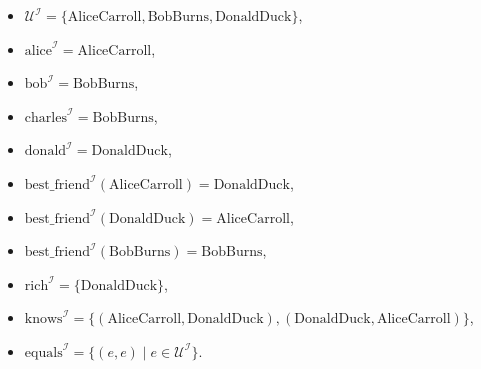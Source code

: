 \documentclass{acAssignment}
\begin{document}
\begin{itemize}
    \item $\mathcal{U}^\mathcal{I} = \{\mathrm{AliceCarroll}, \mathrm{BobBurns}, \mathrm{DonaldDuck}\}$,
    \item $\mathrm{alice}^\mathcal{I} = \mathrm{AliceCarroll}$,
    \item $\mathrm{bob}^\mathcal{I} = \mathrm{BobBurns}$,
    \item $\mathrm{charles}^\mathcal{I} = \mathrm{BobBurns}$,
    \item $\mathrm{donald}^\mathcal{I} = \mathrm{DonaldDuck}$,
    \item $\mathrm{best\_friend}^\mathcal{I}(\mathrm{AliceCarroll}) = \mathrm{DonaldDuck}$,
    \item $\mathrm{best\_friend}^\mathcal{I}(\mathrm{DonaldDuck}) = \mathrm{AliceCarroll}$,
    \item $\mathrm{best\_friend}^\mathcal{I}(\mathrm{BobBurns}) = \mathrm{BobBurns}$,
    \item $\mathrm{rich}^\mathcal{I} = \{\mathrm{DonaldDuck}\}$,
    \item $\mathrm{knows}^\mathcal{I} = \{(\mathrm{AliceCarroll}, \mathrm{DonaldDuck}), (\mathrm{DonaldDuck}, \mathrm{AliceCarroll})\}$,
    \item $\mathrm{equals}^\mathcal{I} = \{(e, e) \mid e \in \mathcal{U}^\mathcal{I}\}$.
\end{itemize}
    
\end{document}
